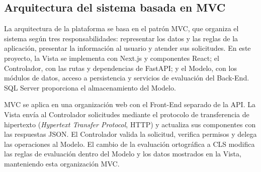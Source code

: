 \subsection{Arquitectura del sistema basada en MVC}
\label{sec:arquitectura-mvc}

La arquitectura de la plataforma se basa en el patrón MVC, que organiza el sistema según tres responsabilidades: representar los datos y las reglas de la aplicación, presentar la información al usuario y atender sus solicitudes. En este proyecto, la Vista se implementa con Next.js y componentes React; el Controlador, con las rutas y dependencias de FastAPI; y el Modelo, con los módulos de datos, acceso a persistencia y servicios de evaluación del Back-End. SQL Server proporciona el almacenamiento del Modelo.

MVC se aplica en una organización web con el Front-End separado de la API. La Vista envía al Controlador solicitudes mediante el protocolo de transferencia de hipertexto (\textit{Hypertext Transfer Protocol}, HTTP) y actualiza sus componentes con las respuestas JSON. El Controlador valida la solicitud, verifica permisos y delega las operaciones al Modelo. El cambio de la evaluación ortográfica a CLS modifica las reglas de evaluación dentro del Modelo y los datos mostrados en la Vista, manteniendo esta organización MVC.

